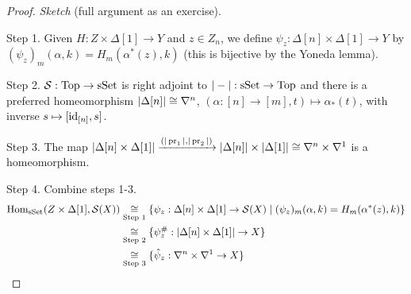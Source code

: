 \begin{proof}
\textit{Sketch} (full argument as an exercise).

Step 1. Given $H:Z\times\Delta[1]\to Y$ and $z\in Z_n$, we define $\psi_z:\Delta[n]\times\Delta[1]\to Y$ by $(\psi_z)_m(\alpha,k)=H_m(\alpha^*(z),k)$ (this is bijective by the Yoneda lemma).

Step 2. $\mathcal{S}:{\mathrm{Top}}\to{\mathrm{sSet}}$ is right adjoint to $|-|:{\mathrm{sSet}}\to{\mathrm{Top}}$ and there is a preferred homeomorphism $|\Delta[n]|\cong\nabla^n$, $(\alpha:[n]\to[m],t)\mapsto\alpha_*(t)$, with inverse $s\mapsto[\operatorname{id}_{[n]},s]$.

Step 3. The map $|\Delta[n]\times\Delta[1]|\xrightarrow{(|\operatorname{pr}_1|,|\operatorname{pr}_2|)}|\Delta[n]|\times|\Delta[1]|\cong\nabla^n\times\nabla^{1}$ is a homeomorphism.

Step 4. Combine steps 1-3.
\begin{align*}
    \operatorname{Hom}_{\mathrm{sSet}}(Z\times\Delta[1],\mathcal{S}(X))&\underset{\text{Step 1}}{\cong}\{\psi_z:\Delta[n]\times\Delta[1]\to\mathcal{S}(X)\mid(\psi_z)_m(\alpha,k)=H_m(\alpha^*(z),k)\} \\
    &\underset{\text{Step 2}}{\cong}\{\psi_z^\#:|\Delta[n]\times\Delta[1]|\to X\} \\
    &\underset{\text{Step 3}}{\cong}\{\hat\psi_z:\nabla^n\times\nabla^{1}\to X\}
\end{align*}

\end{proof}
